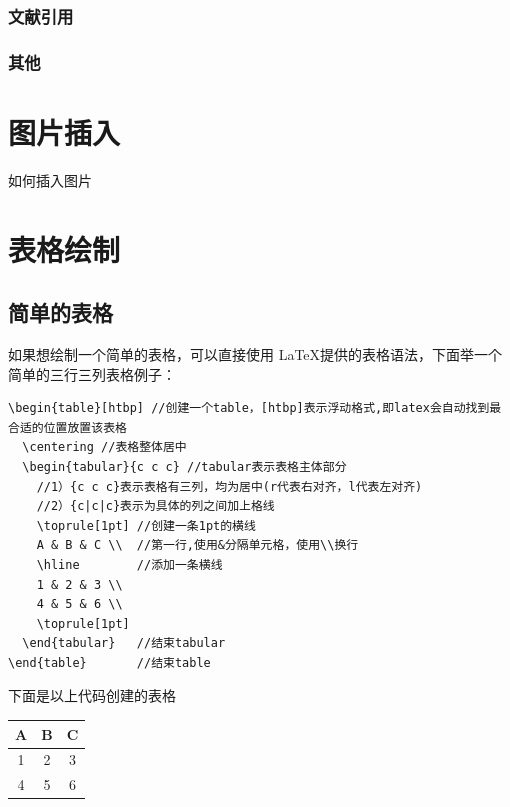 \documentclass[AutoFakeBold]{ZafuThesis}
\begin{document}
\subsubsection{文献引用}


\subsubsection{其他}


\section{图片插入}
如何插入图片
\section{表格绘制}
\subsection{简单的表格}
如果想绘制一个简单的表格，可以直接使用 \LaTeX 提供的表格语法，下面举一个简单的三行三列表格例子：
\begin{lstlisting}
\begin{table}[htbp] //创建一个table，[htbp]表示浮动格式,即latex会自动找到最合适的位置放置该表格
  \centering //表格整体居中
  \begin{tabular}{c c c} //tabular表示表格主体部分
    //1）{c c c}表示表格有三列，均为居中(r代表右对齐，l代表左对齐)
    //2）{c|c|c}表示为具体的列之间加上格线
    \toprule[1pt] //创建一条1pt的横线
    A & B & C \\  //第一行,使用&分隔单元格，使用\\换行
    \hline        //添加一条横线
    1 & 2 & 3 \\
    4 & 5 & 6 \\
    \toprule[1pt]
  \end{tabular}   //结束tabular
\end{table}       //结束table
\end{lstlisting}
\par 下面是以上代码创建的表格
\begin{table}[htbp] 
  \centering 
  \begin{tabular}{c c c}
    \toprule[1pt] 
    A & B & C \\  
    \hline       
    1 & 2 & 3 \\
    4 & 5 & 6 \\
    \toprule[1pt]
  \end{tabular} 
\end{table} 
\end{document}
